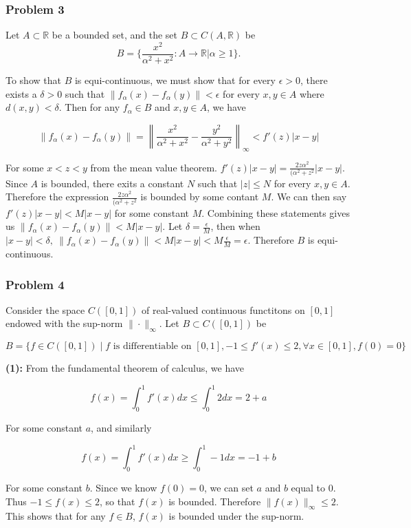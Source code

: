 \documentclass{article}
\newcommand{\R}{\mathbb{R}}
\begin{document}
\subsubsection*{Problem 3}
Let $A \subset \R$ be a bounded set, and the set $B \subset C(A, \R)$ be \\

$$B = \{\frac{x^2}{\alpha^2 + x^2} : A \rightarrow \R | \alpha \geq 1 \}.$$

To show that $B$ is equi-continuous, we must show that for every $\epsilon > 0$, there exists a $\delta > 0$ such that $\|f_\alpha(x) - f_\alpha(y)\| < \epsilon$ for every $x, y \in A$ where $d(x, y) < \delta.$ Then for any $f_\alpha \in B$ and $x, y \in A$, we have

$$\|f_\alpha(x) - f_\alpha(y)\| = \left\|\frac{x^2}{\alpha^2 + x^2} - \frac{y^2}{\alpha^2 + y^2}\right\|_\infty < f'(z)|x-y|$$ 

For some $x < z < y$ from the mean value theorem. $f'(z)|x - y| = \frac{2z\alpha^2}{(\alpha^2 + z^2}|x-y|$. Since $A$ is bounded, there exits a constant $N$ such that $|z| \leq N$ for every $x, y \in A$. Therefore the expression $\frac{2z\alpha^2}{(\alpha^2 + z^2}$ is bounded by some contant $M$. We can then say $f'(z)|x - y| < M|x-y|$ for some constant $M$. Combining these statements gives us $\|f_\alpha(x) - f_\alpha(y)\| < M|x - y|$. Let $\delta = \frac{\epsilon}{M}$, then when $|x - y| < \delta, \ \|f_\alpha(x) - f_\alpha(y)\| < M|x-y| < M \frac{\epsilon}{M} = \epsilon$. Therefore $B$ is equi-continuous.

\subsubsection*{Problem 4}
Consider the space $C([0, 1])$ of real-valued continuous functitons on $[0, 1]$ endowed with the sup-norm $\|\cdot\|_\infty$. Let $B \subset C([0, 1])$ be

$$B = \{f \in C([0, 1]) \mid f \text{ is differentiable on }[0, 1], -1 \leq f'(x) \leq 2, \forall x \in [0, 1], f(0) = 0\}$$

\noindent \textbf{(1):} From the fundamental theorem of calculus, we have

$$f(x) = \int^1_0 f'(x)dx \leq \int^1_0 2dx = 2 + a$$

For some constant $a$, and similarly

$$f(x) = \int^1_0 f'(x)dx \geq \int^1_0 -1dx = -1 + b$$

For some constant $b$. Since we know $f(0) = 0$, we can set $a$ and $b$ equal to $0$. Thus $-1 \leq f(x) \leq 2$, so that $f(x)$ is bounded. Therefore $\|f(x)\|_\infty \leq 2$. This shows that for any $f \in B$, $f(x)$ is bounded under the sup-norm. 
\end{document}
